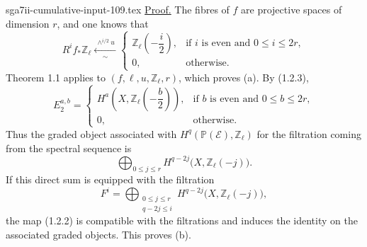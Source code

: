 \begin{filecontents*}{sga7ii-cumulative-input-109.tex}
\noindent\underline{Proof.}
The fibres of $f$ are projective spaces of dimension $r$, and one knows that
\begin{equation}\tag{1.2.3}
R^if_*\mathbb Z_\ell
\xleftarrow[\ \sim\ ]{\ \wedge^{i/2}u\ }
\begin{cases}
\mathbb Z_\ell\left(-\dfrac{i}{2}\right),
  & \text{if $i$ is even and $0\leq i\leq2r$},\\[2ex]
0, & \text{otherwise}.
\end{cases}
\end{equation}
Theorem 1.1 applies to $(f,\ell,u,\mathbb Z_\ell,r)$, which proves (a).
By (1.2.3),
\begin{equation}\tag{1.2.4}
E_2^{a,b}=
\begin{cases}
H^a\left(X,\mathbb Z_\ell\left(-\dfrac b2\right)\right),
  & \text{if $b$ is even and $0\leq b\leq2r$},\\[2ex]
0, & \text{otherwise}.
\end{cases}
\end{equation}
Thus the graded object associated with
$H^q(\mathbb P(\mathcal E),\mathbb Z_\ell)$ for the filtration coming
from the spectral sequence is
\[
\bigoplus_{0\leq j\leq r}
H^{q-2j}\bigl(X,\mathbb Z_\ell(-j)\bigr).
\]
If this direct sum is equipped with the filtration
\[
F^i=
\bigoplus_{\substack{0\leq j\leq r\\q-2j\leq i}}
H^{q-2j}\bigl(X,\mathbb Z_\ell(-j)\bigr),
\]
the map (1.2.2) is compatible with the filtrations and induces the identity on
the associated graded objects. This proves (b).

\end{filecontents*}
